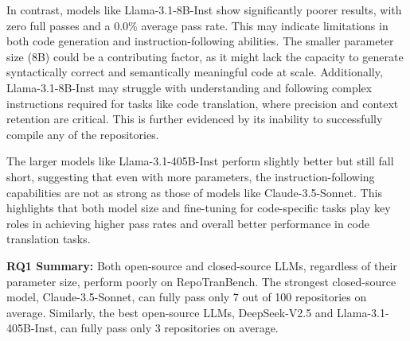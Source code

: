 In contrast, models like Llama-3.1-8B-Inst show significantly poorer results, with zero full passes and a 0.0\% average pass rate. This may indicate limitations in both code generation and instruction-following abilities. The smaller parameter size (8B) could be a contributing factor, as it might lack the capacity to generate syntactically correct and semantically meaningful code at scale. Additionally, Llama-3.1-8B-Inst may struggle with understanding and following complex instructions required for tasks like code translation, where precision and context retention are critical. This is further evidenced by its inability to successfully compile any of the repositories.

The larger models like Llama-3.1-405B-Inst perform slightly better but still fall short, suggesting that even with more parameters, the instruction-following capabilities are not as strong as those of models like Claude-3.5-Sonnet. This highlights that both model size and fine-tuning for code-specific tasks play key roles in achieving higher pass rates and overall better performance in code translation tasks.

\begin{center}
    \begin{myboxc} \textbf{RQ1 Summary: } %
    Both open-source and closed-source LLMs, regardless of their parameter size, perform poorly on RepoTranBench. The strongest closed-source model, Claude-3.5-Sonnet, can fully pass only 7 out of 100 repositories on average. Similarly, the best open-source LLMs, DeepSeek-V2.5 and Llama-3.1-405B-Inst, can fully pass only 3 repositories on average.
    \end{myboxc} %
\end{center}


